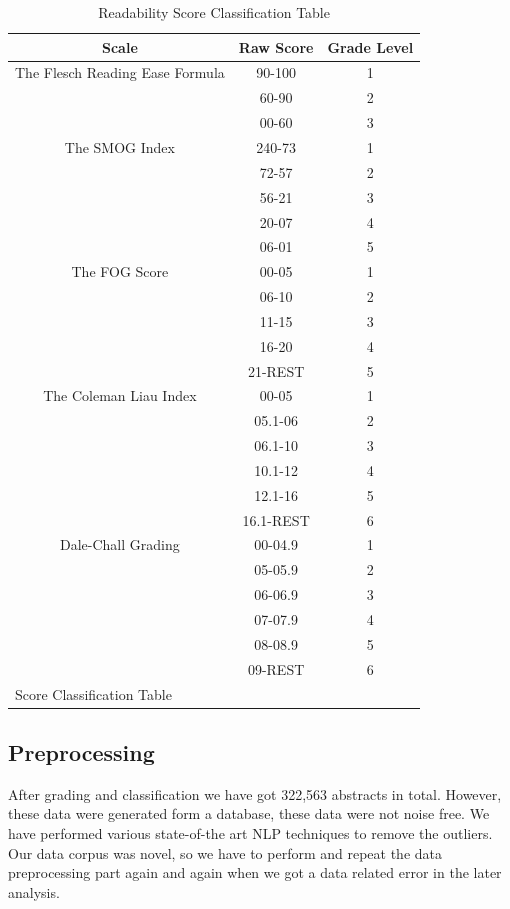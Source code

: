 \documentclass[conference]{IEEEtran}
\begin{document}
\begin{table}[htbp]
\caption{Readability Score Classification Table}
\begin{center}
\def\arraystretch{1.5}%
\begin{tabular}{|c|c|c|}
\hline
\textbf{Scale}&\textbf{Raw Score}&\textbf{Grade Level} \\
\hline
The Flesch Reading Ease Formula & 90-100 & 1  \\
\hline
& 60-90 & 2  \\
\hline
& 00-60 & 3 \\
\hline
The SMOG Index & 240-73 & 1 \\
\hline
& 72-57 & 2 \\
\hline
& 56-21 & 3 \\
\hline
& 20-07 & 4 \\
\hline
& 06-01 & 5 \\
\hline
The FOG Score & 00-05 & 1 \\
\hline
& 06-10 & 2 \\
\hline
& 11-15 & 3 \\
\hline
& 16-20 & 4 \\
\hline
& 21-REST & 5 \\
\hline
The Coleman Liau Index & 00-05 & 1 \\
\hline
& 05.1-06 & 2 \\
\hline
& 06.1-10 & 3 \\
\hline
& 10.1-12 & 4 \\
\hline
& 12.1-16 & 5 \\
\hline
& 16.1-REST & 6 \\
\hline
Dale-Chall Grading & 00-04.9 & 1 \\
\hline
& 05-05.9 & 2 \\
\hline
& 06-06.9 & 3 \\
\hline
& 07-07.9 & 4 \\
\hline
& 08-08.9 & 5 \\
\hline
& 09-REST & 6 \\
\hline
\multicolumn{2}{l}{Score Classification Table \cite{b15}\cite{b16}}
\end{tabular}
\label{tab2}
\end{center}
\end{table}

\subsection{Preprocessing}
After grading and classification we have got 322,563 abstracts in total. However, these data were generated form a database, these data were not noise free. We have performed various state-of-the art NLP techniques to remove the outliers. Our data corpus was novel, so we have to perform and repeat the data preprocessing part again and again when we got a data related error in the later analysis.
\end{document}
